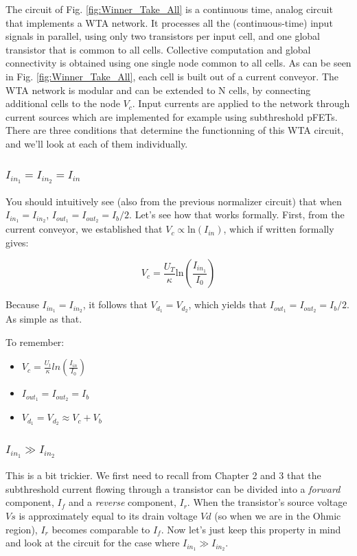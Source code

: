 The circuit of Fig. \ref{fig:Winner_Take_All} is a continuous time, analog circuit that implements a WTA network. It processes all the (continuous-time) input signals in parallel, using only two transistors per input cell, and one global transistor that is common to all cells. Collective computation and global connectivity is obtained using one single node common to all cells. As can be seen in Fig. \ref{fig:Winner_Take_All}, each cell is built out of a current conveyor. The WTA network is modular and can be extended to N cells, by connecting additional cells to the node $V_c$. Input currents are applied to the network through current sources which are implemented for example using subthreshold pFETs. There are three conditions that determine the functionning of this WTA circuit, and we'll look at each of them individually. 

\subsubsection{$I_{in_1} = I_{in_2} = I_{in}$}

You should intuitively see (also from the previous normalizer circuit) that when $I_{in_1} = I_{in_2}$, $I_{out_1} = I_{out_2} = I_b/2$. Let's see how that works formally. First, from the current conveyor, we established that $V_c \propto \mathrm{ln}(I_{in})$, which if written formally gives: 

\begin{equation}
    V_c = \frac{U_T}{\kappa}\mathrm{ln}(\frac{I_{in_1}}{I_0})
\end{equation}

Because $I_{in_1} = I_{in_2}$, it follows that $V_d_1 = V_d_2$, which yields that $I_{out_1} = I_{out_2} = I_b/2$. As simple as that. 


To remember: 

\begin{itemize}
    \item $V_c = \frac{U_t}{\kappa}ln(\frac{I_{in}}{I_0})$
    \item $I_{out}_1 = I_{out}_2 = I_b$
    \item $V_d_1 = V_d_2 \approx V_c + V_b$
\end{itemize}


\subsubsection{$I_{in_1} \gg I_{in_2}$}

This is a bit trickier. We first need to recall from Chapter 2 and 3 that the subthreshold current flowing through a transistor can be divided into a \textit{forward} component, $I_f$ and a \textit{reverse} component, $I_r$. When the transistor’s source voltage $Vs$ is approximately equal to its drain voltage $Vd$ (so when we are in the Ohmic region), $I_r$ becomes comparable to $I_f$. Now let's just keep this property in mind and look at the circuit for the case where $I_{in_1} \gg I_{in_2}$.

